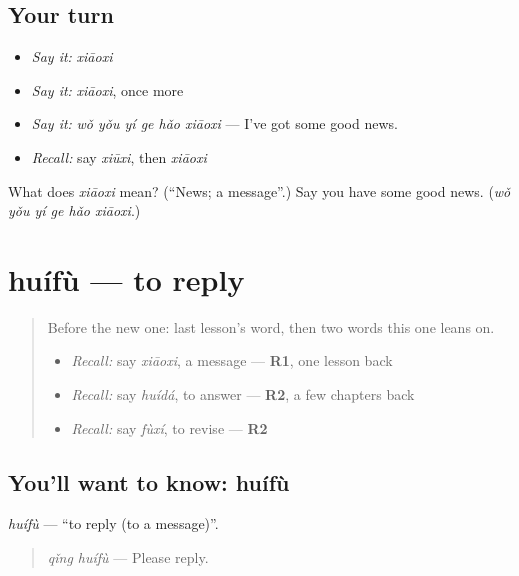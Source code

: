 \subsection*{Your turn}
\begin{itemize}
\raggedright
  \item \emph{Say it:} \emph{xiāoxi}
  \item \emph{Say it:} \emph{xiāoxi}, once more
  \item \emph{Say it:} \emph{wǒ yǒu yí ge hǎo xiāoxi} — I've got some good news.
  \item \emph{Recall:} say \emph{xiūxi}, then \emph{xiāoxi}
\end{itemize}

\begin{tcolorbox}[breakable,colback=teal!4,colframe=teal!35!black,title={Before you move on}]
What does \emph{xiāoxi} mean? (\textquotedblleft{}News; a message\textquotedblright{}.) Say you have some good news. (\emph{wǒ yǒu yí ge hǎo xiāoxi}.)
\end{tcolorbox}
\section[huífù]{huífù — to reply}

\label{lesson:ZH-C157-huifu}



\begin{quote}
Before the new one: last lesson's word, then two words this one leans on.

\begin{itemize}
\raggedright
  \item \emph{Recall:} say \emph{xiāoxi}, a message — \textbf{R1}, one lesson back
  \item \emph{Recall:} say \emph{huídá}, to answer — \textbf{R2}, a few chapters back
  \item \emph{Recall:} say \emph{fùxí}, to revise — \textbf{R2}
\end{itemize}
\end{quote}

\subsection*{You'll want to know: huífù}
\emph{huífù} — \textquotedblleft{}to reply (to a message)\textquotedblright{}.

\begin{quote}
\emph{qǐng huífù} — Please reply.
\end{quote}

